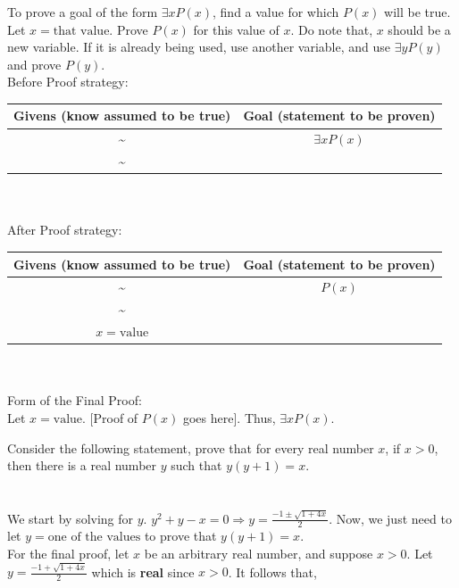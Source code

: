 \documentclass[../setup.tex]{subfiles}
\begin{document}
\begin{theorem}
	To prove a goal of the form $\exists{x}P(x)$, find a value for which $P(x)$ will be true. Let $x = \text{that value}$. Prove $P(x)$ for this value of $x$. Do note that, $x$ should be a new variable. If it is already being used, use another variable, and use $\exists{y}P(y)$ and prove $P(y)$. \\
	Before Proof strategy:
	\begin{center}
	\begin{tabular}[t]{| c | c |}
		\hline
		Givens (know assumed to be true) & Goal (statement to be proven) \\
		\hline
		\textasciitilde & $\exists{x}P(x)$\\
		\textasciitilde & \\
		\hline
	\end{tabular}
	\end{center}
	\phantom \\ \\
	After Proof strategy:
	\begin{center}
	\begin{tabular}[t]{| c | c |}
		\hline
		Givens (know assumed to be true) & Goal (statement to be proven) \\
		\hline
		\textasciitilde & $P(x)$\\
		\textasciitilde & \\
		$x = \text{value}$ & \\
		\hline
	\end{tabular}
	\end{center}
	\phantom \\ \\
	Form of the Final Proof: \\
	Let $x = \text{value}$. [Proof of $P(x)$ goes here]. Thus, $\exists{x}P(x)$.
\end{theorem}
Consider the following statement, prove that for every real number $x$, if $x > 0$, then there is a real number $y$ such that $y(y + 1) = x$. \\
\phantom \\ \\
We start by solving for $y$. $y^2 + y - x = 0 \Rightarrow y = \frac{-1 \pm \sqrt{1 + 4x}}{2}$. Now, we just need to let $y = \text{one of the values}$ to prove that $y(y + 1) = x$. \\
For the final proof, let $x$ be an arbitrary real number, and suppose $x > 0$. Let $y = \frac{-1 + \sqrt{1 + 4x}}{2}$ which is \textbf{real} since $x > 0$. It follows that, 
\end{document}

